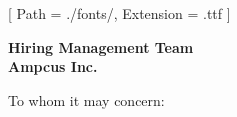 


\renewcommand{\photo}[2]{}

\geometry{
  left=2cm,
  right=2cm,
  top=2cm,
  bottom=2cm
}



\makecvheader

\setmainfont{NotoSans-Regular}[
  Path = ./fonts/,
  Extension = .ttf
]

\vspace{1cm}
\indent\textbf{Hiring Management Team}\\
\indent\textbf{Ampcus Inc.
}

\vspace{0.5cm}

\noindent To whom it may concern:

\vspace{0.5cm}


